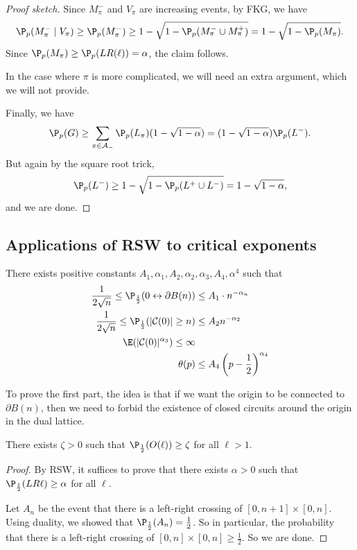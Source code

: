 \documentclass[a4paper]{article}
\begin{document}
\begin{proof}[Proof sketch]
  Since $M_\pi^-$ and $V_\pi$ are increasing events, by FKG, we have
  \[
    \P_p(M_\pi^- \mid V_\pi) \geq \P_p(M_\pi^-) \geq 1 - \sqrt{1 - \P_p(M_\pi^- \cup M_\pi^+)} = 1 - \sqrt{1 - \P_p(M_\pi)}.
  \]
  Since $\P_p(M_\pi) \geq \P_p(LR(\ell)) = \alpha$, the claim follows.

  In the case where $\pi$ is more complicated, we will need an extra argument, which we will not provide.

  Finally, we have
  \[
    \P_p(G) \geq \sum_{\pi \in \mathcal{A}_-} \P_p(L_\pi) (1 - \sqrt{1 - \alpha}) = (1 - \sqrt{1 - \alpha})\P_p(L^-).
  \]
  But again by the square root trick,
  \[
    \P_p(L^-) \geq 1 - \sqrt{1 - \P_p(L^+ \cup L^-)} = 1 - \sqrt{1 - \alpha},
  \]
  and we are done.
\end{proof}

\subsection{Applications of RSW to critical exponents}
\begin{thm}
  There exists positive constants $A_1, \alpha_1, A_2, \alpha_2, \alpha_3, A_4, \alpha^4$ such that
  \begin{align*}
    \frac{1}{2\sqrt{n}} \leq \P_{\frac{1}{2}} (0 \leftrightarrow \partial B(n)) &\leq A_1 \cdot n^{-\alpha_n}\\
    \frac{1}{2\sqrt{n}} \leq \P_{\frac{1}{2}} (|\mathcal{C}(0)| \geq n) &\leq A_2 n^{-\alpha_2}\\
    \E(|\mathcal{C}(0)|^{\alpha_3}) \leq \infty\\
    \theta(p) &\leq A_4 \left(p - \frac{1}{2}\right)^{\alpha_4}
  \end{align*}
\end{thm}
To prove the first part, the idea is that if we want the origin to be connected to $\partial B(n)$, then we need to forbid the existence of closed circuits around the origin in the dual lattice.

\begin{lemma}
  There exists $\zeta > 0$ such that $\P_{\frac{1}{2}}(O(\ell)) \geq \zeta$ for all $\ell > 1$.
\end{lemma}

\begin{proof}
  By RSW, it suffices to prove that there exists $\alpha > 0$ such that $\P_{\frac{1}{2}} (LR \ell) \geq \alpha$ for all $\ell$.

  Let $A_n$ be the event that there is a left-right crossing of $[0, n + 1] \times [0, n]$. Using duality, we showed that $\P_{\frac{1}{2}}(A_n) = \frac{1}{2}$. So in particular, the probability that there is a left-right crossing of $[0, n] \times [0, n] \geq \frac{1}{2}$. So we are done.
  
\end{proof}
\end{document}
